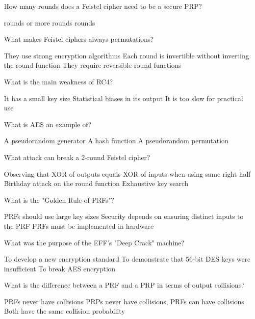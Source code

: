 \documentclass[10pt,a4paper,american]{exam}
\begin{document}
\begin{questions}
	\question How many rounds does a Feistel cipher need to be a secure PRP?
	\begin{randomizechoices}
		 rounds
		 or more rounds
		 rounds
	\end{randomizechoices}

	\question What makes Feistel ciphers always permutations?
	\begin{randomizechoices}
		\choice They use strong encryption algorithms
		\CorrectChoice Each round is invertible without inverting the round function
		\choice They require reversible round functions
	\end{randomizechoices}

	\question What is the main weakness of RC4?
	\begin{randomizechoices}
		\choice It has a small key size
		\CorrectChoice Statistical biases in its output
		\choice It is too slow for practical use
	\end{randomizechoices}

	\question What is AES an example of?
	\begin{randomizechoices}
		\choice A pseudorandom generator
		\choice A hash function
		\CorrectChoice A pseudorandom permutation
	\end{randomizechoices}

	\question What attack can break a 2-round Feistel cipher?
	\begin{randomizechoices}
		\CorrectChoice Observing that XOR of outputs equals XOR of inputs when using same right half
		\choice Birthday attack on the round function
		\choice Exhaustive key search
	\end{randomizechoices}

	\question What is the "Golden Rule of PRFs"?
	\begin{randomizechoices}
		\choice PRFs should use large key sizes
		\CorrectChoice Security depends on ensuring distinct inputs to the PRF
		\choice PRFs must be implemented in hardware
	\end{randomizechoices}

	\question What was the purpose of the EFF's "Deep Crack" machine?
	\begin{randomizechoices}
		\choice To develop a new encryption standard
		\CorrectChoice To demonstrate that 56-bit DES keys were insufficient
		\choice To break AES encryption
	\end{randomizechoices}

	\question What is the difference between a PRF and a PRP in terms of output collisions?
	\begin{randomizechoices}
		\choice PRFs never have collisions
		\CorrectChoice PRPs never have collisions, PRFs can have collisions
		\choice Both have the same collision probability
	\end{randomizechoices}


\end{questions}
\end{document}

